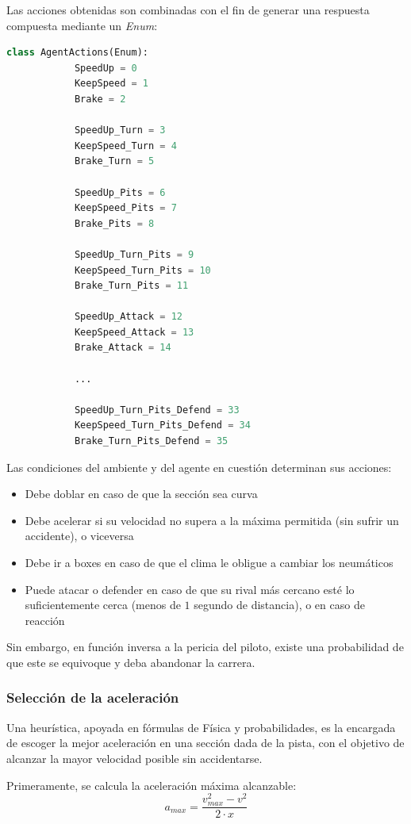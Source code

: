 \documentclass[12pt, letterpaper,spanish]{article}
\theoremstyle{definition}
\theoremstyle{remark}
\begin{document}
		Las acciones obtenidas son combinadas con el fin de generar una respuesta compuesta mediante un \emph{Enum}:	
		\begin{lstlisting}[language={Python}, label={Script}]
		class AgentActions(Enum):
		    SpeedUp = 0
		    KeepSpeed = 1
		    Brake = 2
		
		    SpeedUp_Turn = 3
		    KeepSpeed_Turn = 4
		    Brake_Turn = 5
		
		    SpeedUp_Pits = 6
		    KeepSpeed_Pits = 7
		    Brake_Pits = 8
		
		    SpeedUp_Turn_Pits = 9
		    KeepSpeed_Turn_Pits = 10
		    Brake_Turn_Pits = 11
		
		    SpeedUp_Attack = 12
		    KeepSpeed_Attack = 13
		    Brake_Attack = 14
		
		    ...
		
		    SpeedUp_Turn_Pits_Defend = 33
		    KeepSpeed_Turn_Pits_Defend = 34
		    Brake_Turn_Pits_Defend = 35
		\end{lstlisting}

		Las condiciones del ambiente y del agente en cuestión determinan sus acciones:
		\begin{itemize}
			\item Debe doblar en caso de que la sección sea curva
			\item Debe acelerar si su velocidad no supera a la máxima permitida (sin sufrir un accidente), o viceversa
			\item Debe ir a boxes en caso de que el clima le obligue a cambiar los neumáticos
			\item Puede atacar o defender en caso de que su rival más cercano esté lo suficientemente cerca (menos de $1$ segundo de distancia), o en caso de reacción
		\end{itemize}

		Sin embargo, en función inversa a la pericia del piloto, existe una probabilidad de que este se equivoque y deba abandonar la carrera.
		
	
		\subsubsection{Selección de la aceleración}
		Una heurística, apoyada en fórmulas de Física y probabilidades, es la encargada de escoger la mejor aceleración en una sección dada de la pista, con el objetivo de alcanzar la mayor velocidad posible sin accidentarse. 

		Primeramente, se calcula la aceleración máxima alcanzable:
		\begin{equation}\label{eq:a_max}
		a_{max}=\frac{v_{max}^{2} - v^{2}}{2 \cdot x}
		\end{equation}
\end{document}
